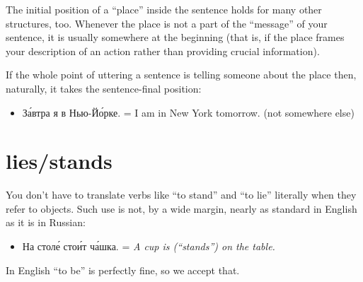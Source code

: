 The initial position of a ``place'' inside the sentence holds for many
other structures, too. Whenever the place is not a part of the
``message'' of your sentence, it is usually somewhere at the beginning
(that is, if the place frames your description of an action rather than
providing crucial information).

If the whole point of uttering a sentence is telling someone about the
place then, naturally, it takes the sentence-final position:

\begin{itemize}
\tightlist
\item
  З\'{а}втра я в Нью-Й\'{о}рке. = I am in New York tomorrow. (not somewhere
  else)
\end{itemize}

\section{lies/stands}\label{liesstands}

You don't have to translate verbs like ``to stand'' and ``to lie''
literally when they refer to objects. Such use is not, by a wide margin,
nearly as standard in English as it is in Russian:

\begin{itemize}
\tightlist
\item
  На стол\'{е} сто\'{и}т ч\'{а}шка. = \emph{A cup is (``stands'') on the table.}
\end{itemize}

In English ``to be'' is perfectly fine, so we accept that.
